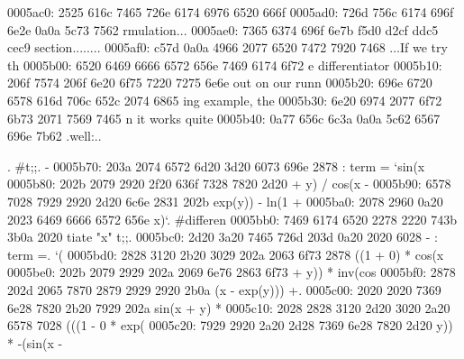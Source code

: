 \begin{bo
00010e0: 7865 647d 5c62 6567 696e 7b76 6572 6261  xed}
\begin{verba
00010f0: 7469 6d7d 0a20 2023 7479 7065 2074 6572  tim}
\begin{
0001c40: 7665 7262 6174 696d 7d0a 2020 236c 6574  verbatim}
\begin{boxe
00027a0: 647d 5c62 6567 696e 7b76 6572 6261 7469  d}
\begin{verbati
00027b0: 6d7d 0a20 2023 6c65 7420 696e 6669 7865  m}
\begin{v
0002c60: 6572 6261 7469 6d7d 0a20 2023 6c65 7420  erbatim}
\begin{
0002dc0: 7665 7262 6174 696d 7d0a 2020 236c 6574  verbatim}
\begin{boxed
0002f30: 7d5c 6265 6769 6e7b 7665 7262 6174 696d  }
\begin{verbatim
0002f40: 7d0a 2020 236c 6574 2068 6428 683a 3a74  }
\begin{v
0003e60: 6572 6261 7469 6d7d 0a20 2023 236f 7065  erbatim}
\begin{boxed
00042b0: 7d5c 6265 6769 6e7b 7665 7262 6174 696d  }
\begin{verbatim
00042c0: 7d0a 2020 2328 782c 7429 3b3b 0a20 202d  }
\begin{boxed}
\begin{boxed}
0005ac0: 2525 616c 7465 726e 6174 6976 6520 666f  %
0005ad0: 726d 756c 6174 696f 6e2e 0a0a 5c73 7562  rmulation...\sub
0005ae0: 7365 6374 696f 6e7b f5d0 d2cf ddc5 cec9  section{........
0005af0: c57d 0a0a 4966 2077 6520 7472 7920 7468  .}..If we try th
0005b00: 6520 6469 6666 6572 656e 7469 6174 6f72  e differentiator
0005b10: 206f 7574 206f 6e20 6f75 7220 7275 6e6e   out on our runn
0005b20: 696e 6720 6578 616d 706c 652c 2074 6865  ing example, the
0005b30: 6e20 6974 2077 6f72 6b73 2071 7569 7465  n it works quite
0005b40: 0a77 656c 6c3a 0a0a 5c62 6567 696e 7b62  .well:..\begin{b
0005b50: 6f78 6564 7d5c 6265 6769 6e7b 7665 7262  oxed}\begin{verb
0005b60: 6174 696d 7d0a 2020 2374 3b3b 0a20 202d  atim}.  #t;;.  -
0005b70: 203a 2074 6572 6d20 3d20 6073 696e 2878   : term = `sin(x
0005b80: 202b 2079 2920 2f20 636f 7328 7820 2d20   + y) / cos(x - 
0005b90: 6578 7028 7929 2920 2d20 6c6e 2831 202b  exp(y)) - ln(1 +
0005ba0: 2078 2960 0a20 2023 6469 6666 6572 656e   x)`.  #differen
0005bb0: 7469 6174 6520 2278 2220 743b 3b0a 2020  tiate "x" t;;.  
0005bc0: 2d20 3a20 7465 726d 203d 0a20 2020 6028  - : term =.   `(
0005bd0: 2828 3120 2b20 3029 202a 2063 6f73 2878  ((1 + 0) * cos(x
0005be0: 202b 2079 2929 202a 2069 6e76 2863 6f73   + y)) * inv(cos
0005bf0: 2878 202d 2065 7870 2879 2929 2920 2b0a  (x - exp(y))) +.
0005c00: 2020 2020 7369 6e28 7820 2b20 7929 202a      sin(x + y) *
0005c10: 2028 2828 3120 2d20 3020 2a20 6578 7028   (((1 - 0 * exp(
0005c20: 7929 2920 2a20 2d28 7369 6e28 7820 2d20  y)) * -(sin(x - 

\end{verb
0005b60: 6174 696d 7d0a 2020 2374 3b3b 0a20 202d  atim}
\end{b
0005b50: 6f78 6564 7d5c 6265 6769 6e7b 7665 7262  oxed}
\end{boxed}
\end{boxed}
\end{verbatim
00042c0: 7d0a 2020 2328 782c 7429 3b3b 0a20 202d  }
\end{boxed
00042b0: 7d5c 6265 6769 6e7b 7665 7262 6174 696d  }
\end{v
0003e60: 6572 6261 7469 6d7d 0a20 2023 236f 7065  erbatim}
\end{verbatim
0002f40: 7d0a 2020 236c 6574 2068 6428 683a 3a74  }
\end{boxed
0002f30: 7d5c 6265 6769 6e7b 7665 7262 6174 696d  }
\end{
0002dc0: 7665 7262 6174 696d 7d0a 2020 236c 6574  verbatim}
\end{v
0002c60: 6572 6261 7469 6d7d 0a20 2023 6c65 7420  erbatim}
\end{verbati
00027b0: 6d7d 0a20 2023 6c65 7420 696e 6669 7865  m}
\end{boxe
00027a0: 647d 5c62 6567 696e 7b76 6572 6261 7469  d}
\end{
0001c40: 7665 7262 6174 696d 7d0a 2020 236c 6574  verbatim}
\end{verba
00010f0: 7469 6d7d 0a20 2023 7479 7065 2074 6572  tim}
\end{bo
00010e0: 7865 647d 5c62 6567 696e 7b76 6572 6261  xed}
